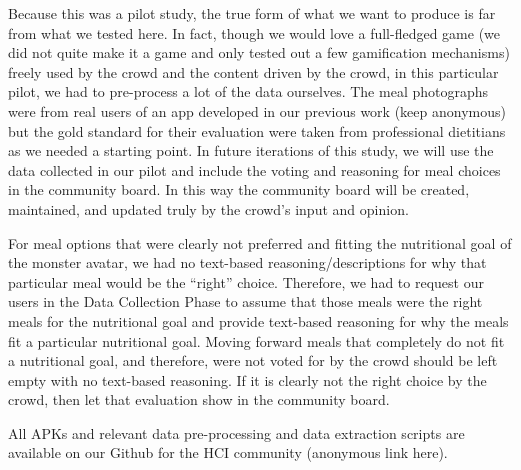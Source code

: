 

Because this was a pilot study, the true form of what we want to produce is far from what we tested here. In fact, though we would love a full-fledged game (we did not quite make it a game and only tested out a few gamification mechanisms) freely used by the crowd and the content driven by the crowd, in this particular pilot, we had to pre-process a lot of the data ourselves. The meal photographs were from real users of an app developed in our previous work (keep anonymous) but the gold standard for their evaluation were taken from professional dietitians as we needed a starting point. In future iterations of this study, we will use the data collected in our pilot and include the voting and reasoning for meal choices in the community board. In this way the community board will be created, maintained, and updated truly by the crowd's input and opinion.  

For meal options that were clearly not preferred and fitting the nutritional goal of the monster avatar, we had no text-based reasoning/descriptions for why that particular meal would be the ``right'' choice. Therefore, we had to request our users in the Data Collection Phase to assume that those meals were the right meals for the nutritional goal and provide text-based reasoning for why the meals fit a particular nutritional goal. Moving forward meals that completely do not fit a nutritional goal, and therefore, were not voted for by the crowd should be left empty with no text-based reasoning. If it is clearly not the right choice by the crowd, then let that evaluation show in the community board.  


All APKs and relevant data pre-processing and data extraction scripts are available on our Github for the HCI community (anonymous link here). 



